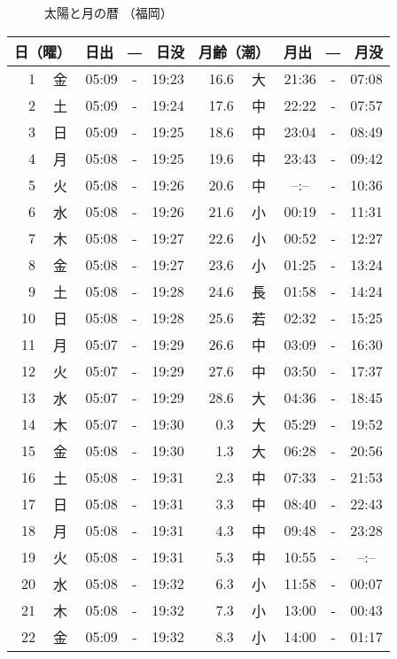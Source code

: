 \documentclass[a4j,10pt]{jsarticle}
\begin{document}
\begin{center}
  {\Large 　　　太陽と月の暦   （福岡） }
  \begin{table}[ht]
  \begin{center}
     \begin{tabular}{|rc|ccc|rc|ccc|}
     \hline
     \multicolumn{2}{|c|}{日（曜）} & \multicolumn{3}{c|}{日出　―　日没} & \multicolumn{2}{c|}{月齢（潮）} & \multicolumn{3}{c|}{月出　―　月没}\\
     \hline
  1 & 金 & 05:09 &-& 19:23 & 16.6 & 大 & 21:36 &-& 07:08 \\
  2 & 土 & 05:09 &-& 19:24 & 17.6 & 中 & 22:22 &-& 07:57 \\
  3 & 日 & 05:09 &-& 19:25 & 18.6 & 中 & 23:04 &-& 08:49 \\
  4 & 月 & 05:08 &-& 19:25 & 19.6 & 中 & 23:43 &-& 09:42 \\
  5 & 火 & 05:08 &-& 19:26 & 20.6 & 中 &  --:--  &-& 10:36 \\
  6 & 水 & 05:08 &-& 19:26 & 21.6 & 小 & 00:19 &-& 11:31 \\
  7 & 木 & 05:08 &-& 19:27 & 22.6 & 小 & 00:52 &-& 12:27 \\
  8 & 金 & 05:08 &-& 19:27 & 23.6 & 小 & 01:25 &-& 13:24 \\
  9 & 土 & 05:08 &-& 19:28 & 24.6 & 長 & 01:58 &-& 14:24 \\
 10 & 日 & 05:08 &-& 19:28 & 25.6 & 若 & 02:32 &-& 15:25 \\
 11 & 月 & 05:07 &-& 19:29 & 26.6 & 中 & 03:09 &-& 16:30 \\
 12 & 火 & 05:07 &-& 19:29 & 27.6 & 中 & 03:50 &-& 17:37 \\
 13 & 水 & 05:07 &-& 19:29 & 28.6 & 大 & 04:36 &-& 18:45 \\
 14 & 木 & 05:07 &-& 19:30 &  0.3 & 大 & 05:29 &-& 19:52 \\
 15 & 金 & 05:08 &-& 19:30 &  1.3 & 大 & 06:28 &-& 20:56 \\
 16 & 土 & 05:08 &-& 19:31 &  2.3 & 中 & 07:33 &-& 21:53 \\
 17 & 日 & 05:08 &-& 19:31 &  3.3 & 中 & 08:40 &-& 22:43 \\
 18 & 月 & 05:08 &-& 19:31 &  4.3 & 中 & 09:48 &-& 23:28 \\
 19 & 火 & 05:08 &-& 19:31 &  5.3 & 中 & 10:55 &-&  --:--  \\
 20 & 水 & 05:08 &-& 19:32 &  6.3 & 小 & 11:58 &-& 00:07 \\
 21 & 木 & 05:08 &-& 19:32 &  7.3 & 小 & 13:00 &-& 00:43 \\
 22 & 金 & 05:09 &-& 19:32 &  8.3 & 小 & 14:00 &-& 01:17 \\

\end{tabular}
\end{center}
\end{table}
\end{center}
\end{document}
